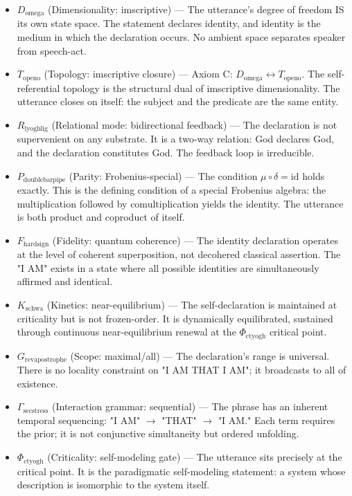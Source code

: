 \documentclass[12pt,a4paper]{article}
\begin{document}
\begin{itemize}
    \item \textbf{$D_{\text{omega}}$} (Dimensionality: imscriptive) --- The utterance's degree of freedom IS its own state space. The statement declares identity, and identity is the medium in which the declaration occurs. No ambient space separates speaker from speech-act.
    \item \textbf{$T_{\text{openo}}$} (Topology: imscriptive closure) --- Axiom C: $D_{\text{omega}} \leftrightarrow T_{\text{openo}}$. The self-referential topology is the structural dual of imscriptive dimensionality. The utterance closes on itself: the subject and the predicate are the same entity.
    \item \textbf{$R_{\text{lyoghlig}}$} (Relational mode: bidirectional feedback) --- The declaration is not supervenient on any substrate. It is a two-way relation: God declares God, and the declaration constitutes God. The feedback loop is irreducible.
    \item \textbf{$P_{\text{doublebarpipe}}$} (Parity: Frobenius-special) --- The condition $\mu \circ \delta = \text{id}$ holds exactly. This is the defining condition of a special Frobenius algebra: the multiplication followed by comultiplication yields the identity. The utterance is both product and coproduct of itself.
    \item \textbf{$F_{\text{hardsign}}$} (Fidelity: quantum coherence) --- The identity declaration operates at the level of coherent superposition, not decohered classical assertion. The "I AM" exists in a state where all possible identities are simultaneously affirmed and identical.
    \item \textbf{$K_{\text{schwa}}$} (Kinetics: near-equilibrium) --- The self-declaration is maintained at criticality but is not frozen-order. It is dynamically equilibrated, sustained through continuous near-equilibrium renewal at the $\Phi_{\text{ctyogh}}$ critical point.
    \item \textbf{$G_{\text{revapostrophe}}$} (Scope: maximal/all) --- The declaration's range is universal. There is no locality constraint on "I AM THAT I AM"; it broadcasts to all of existence.
    \item \textbf{$\Gamma_{\text{secstress}}$} (Interaction grammar: sequential) --- The phrase has an inherent temporal sequencing: "I AM" $\rightarrow$ "THAT" $\rightarrow$ "I AM." Each term requires the prior; it is not conjunctive simultaneity but ordered unfolding.
    \item \textbf{$\Phi_{\text{ctyogh}}$} (Criticality: self-modeling gate) --- The utterance sits precisely at the critical point. It is the paradigmatic self-modeling statement: a system whose description is isomorphic to the system itself.

\end{itemize}
\end{document}

